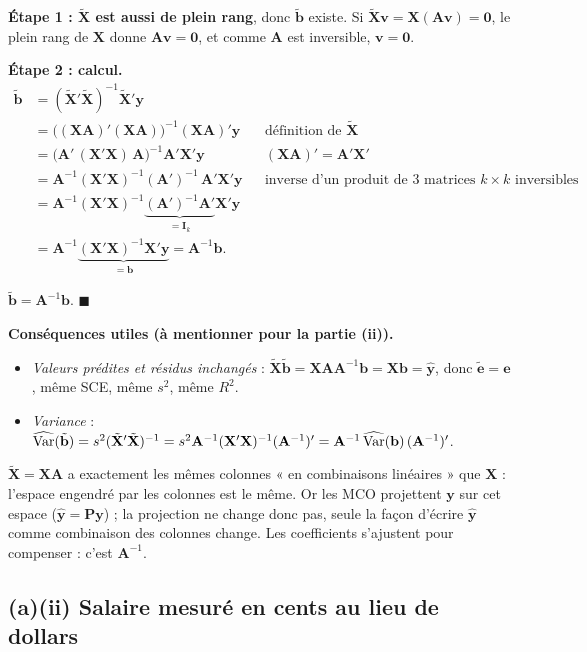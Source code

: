 \documentclass[11pt,a4paper]{article}
\newcommand{\vy}{\mathbf{y}}\newcommand{\vX}{\mathbf{X}}\newcommand{\vZ}{\mathbf{Z}}
\newcommand{\ve}{\mathbf{e}}\newcommand{\vb}{\mathbf{b}}\newcommand{\vc}{\mathbf{c}}
\newcommand{\A}{\mathbf{A}}\newcommand{\I}{\mathbf{I}}
\newcommand{\Pm}{\mathbf{P}}\newcommand{\vx}{\mathbf{x}}\newcommand{\Mz}{\mathbf{M}_Z}\newcommand{\Pz}{\mathbf{P}_Z}
\newcommand{\tX}{\tilde{\mathbf{X}}}
\begin{document}
\textbf{Étape 1 : $\tX$ est aussi de plein rang}, donc $\tilde{\vb}$ existe. Si $\tX\mathbf{v}=\vX(\A\mathbf{v})=\mathbf 0$, le plein rang de $\vX$ donne $\A\mathbf{v}=\mathbf 0$, et comme $\A$ est inversible, $\mathbf{v}=\mathbf 0$.

\textbf{Étape 2 : calcul.}
\begin{align*}
\tilde{\vb}&=(\tX'\tX)^{-1}\tX'\vy\\
&=\big((\vX\A)'(\vX\A)\big)^{-1}(\vX\A)'\vy
 &&\text{définition de }\tX\\
&=\big(\A'\,(\vX'\vX)\,\A\big)^{-1}\A'\vX'\vy
 &&(\vX\A)'=\A'\vX'\\
&=\A^{-1}(\vX'\vX)^{-1}(\A')^{-1}\,\A'\vX'\vy
 &&\text{inverse d'un produit de 3 matrices } k\times k \text{ inversibles}\\
&=\A^{-1}(\vX'\vX)^{-1}\underbrace{(\A')^{-1}\A'}_{=\I_k}\vX'\vy\\
&=\A^{-1}\underbrace{(\vX'\vX)^{-1}\vX'\vy}_{=\vb}=\A^{-1}\vb .
\end{align*}

\begin{reponse}
$\tilde{\vb}=\A^{-1}\vb$. \hfill$\blacksquare$
\end{reponse}

\textbf{Conséquences utiles (à mentionner pour la partie (ii)).}
\begin{itemize}[nosep]
\item \emph{Valeurs prédites et résidus inchangés} : $\tX\tilde{\vb}=\vX\A\A^{-1}\vb=\vX\vb=\hat{\vy}$, donc $\tilde{\ve}=\ve$, même SCE, même $s^2$, même $R^2$.
\item \emph{Variance} : $\widehat{\Var}(\tilde{\vb})=s^2(\tX'\tX)^{-1}=s^2\A^{-1}(\vX'\vX)^{-1}(\A^{-1})'=\A^{-1}\,\widehat{\Var}(\vb)\,(\A^{-1})'$.
\end{itemize}

\begin{intuition}
$\tX=\vX\A$ a exactement les mêmes colonnes « en combinaisons linéaires » que $\vX$ : l'espace engendré par les colonnes est le même. Or les MCO projettent $\vy$ sur cet espace ($\hat{\vy}=\Pm\vy$) ; la projection ne change donc pas, seule la façon d'écrire $\hat{\vy}$ comme combinaison des colonnes change. Les coefficients s'ajustent pour compenser : c'est $\A^{-1}$.
\end{intuition}

\subsection{(a)(ii) Salaire mesuré en cents au lieu de dollars}
\end{document}
